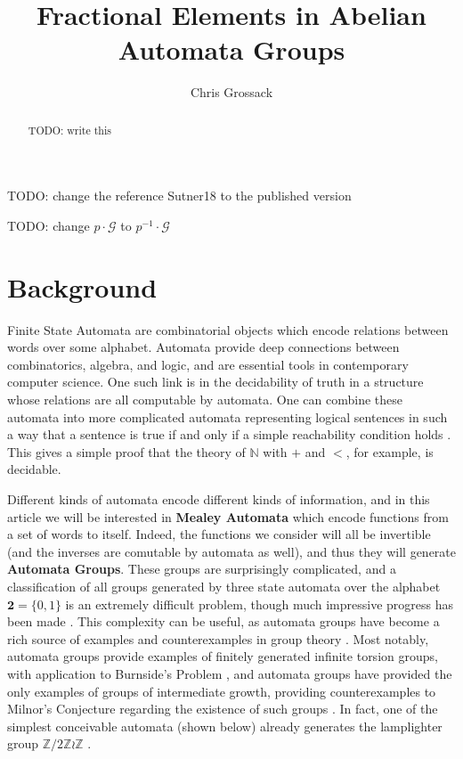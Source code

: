 \documentclass[runningheads]{llncs}
\title{Fractional Elements in Abelian Automata Groups}
\author{Chris Grossack\orcidID{0000-0001-7520-9747}}
\institute%
{%
  Carnegie Mellon University, Pittsburgh, USA\\
  \email{cgrossac@alumni.cmu.edu}
}
\newcommand{\G}{\mathcal{G}}
\newcommand{\Z}{\mathbb{Z}}
\newcommand{\2}{\textbf{2}}
\begin{document}
\maketitle

\begin{abstract}
  TODO: write this

\end{abstract}

TODO: change the reference Sutner18 to the published version

TODO: change $p \cdot \G$ to $p^{-1} \cdot \G$

\section{Background}
Finite State Automata are combinatorial objects which encode relations 
between words over some alphabet. Automata provide deep connections between
combinatorics, algebra, and logic, and are essential tools in contemporary 
computer science. One such link is in the decidability of truth in a structure
whose relations are all computable by automata. One can combine these automata 
into more complicated automata representing logical sentences in such a way 
that a sentence is true if and only if a simple reachability condition holds
\cite{Brny07:automatic_structures}. This gives a simple proof that the theory 
of $\mathbb{N}$ with $+$ and $<$, for example, is decidable.

Different kinds of automata encode different kinds of information, and
in this article we will be interested in \textbf{Mealey Automata} which encode
functions from a set of words to itself. Indeed, the functions we consider
will all be invertible (and the inverses are comutable by automata as well),
and thus they will generate \textbf{Automata Groups}.
These groups are surprisingly complicated, and a classification of all groups 
generated by three state automata over the alphabet $\2 = \{0,1\}$ is an 
extremely difficult problem, though much impressive progress has been 
made \cite{Bondarenko09:three_state}. This complexity can be useful, 
as automata groups have become a rich source of examples and counterexamples
in group theory
\cite{Nekrashevych05:self_similar_groups%
     ,Sidki00:one_rooted_trees%
     ,GrigorchukNS00:automata_groups%
     }. 
Most notably, automata groups provide examples of finitely generated 
infinite torsion groups, with application to 
Burnside's Problem \cite{Gupta83:burnside}, and automata groups have
provided the only examples of groups of intermediate growth, providing 
counterexamples to Milnor's Conjecture regarding the existence of such groups
\cite{Grigorchuk11:Milnor}. In fact, one of the simplest conceivable automata 
(shown below) already generates the lamplighter group $\Z/2\Z \wr \Z$
\cite{GrigorchukZuk01:lamplighter}.
\end{document}
